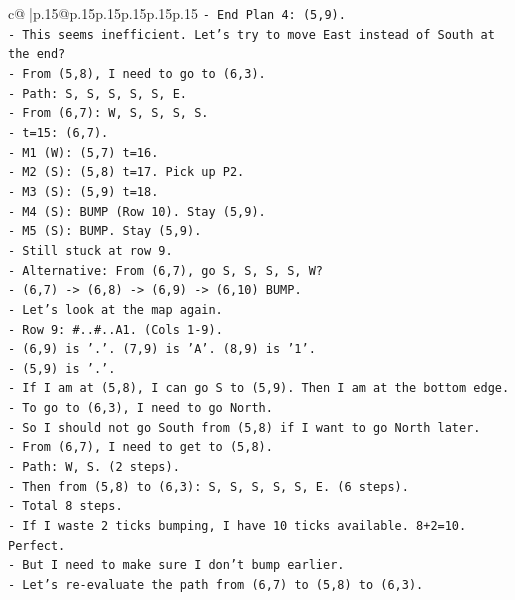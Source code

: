 \documentclass{article}
\begin{document}
{\begin{supertabular}{c@{$\;$}|p{.15\linewidth}@{}p{.15\linewidth}p{.15\linewidth}p{.15\linewidth}p{.15\linewidth}p{.15\linewidth}}
{{{\texttt{{-} End Plan 4: (5,9).} \\
\texttt{{-} This seems inefficient. Let's try to move East instead of South at the end?} \\
\texttt{{-} From (5,8), I need to go to (6,3).} \\
\texttt{{-} Path: S, S, S, S, S, E.} \\
\texttt{{-} From (6,7): W, S, S, S, S.} \\
\texttt{{-} t=15: (6,7).} \\
\texttt{{-} M1 (W): (5,7) t=16.} \\
\texttt{{-} M2 (S): (5,8) t=17. Pick up P2.} \\
\texttt{{-} M3 (S): (5,9) t=18.} \\
\texttt{{-} M4 (S): BUMP (Row 10). Stay (5,9).} \\
\texttt{{-} M5 (S): BUMP. Stay (5,9).} \\
\texttt{{-} Still stuck at row 9.} \\
\texttt{{-} Alternative: From (6,7), go S, S, S, S, W?} \\
\texttt{{-} (6,7) {-}> (6,8) {-}> (6,9) {-}> (6,10) BUMP.} \\
\texttt{{-} Let's look at the map again.} \\
\texttt{{-} Row 9: \#..\#..A1. (Cols 1{-}9).} \\
\texttt{{-} (6,9) is '.'. (7,9) is 'A'. (8,9) is '1'.} \\
\texttt{{-} (5,9) is '.'.} \\
\texttt{{-} If I am at (5,8), I can go S to (5,9). Then I am at the bottom edge.} \\
\texttt{{-} To go to (6,3), I need to go North.} \\
\texttt{{-} So I should not go South from (5,8) if I want to go North later.} \\
\texttt{{-} From (6,7), I need to get to (5,8).} \\
\texttt{{-} Path: W, S. (2 steps).} \\
\texttt{{-} Then from (5,8) to (6,3): S, S, S, S, S, E. (6 steps).} \\
\texttt{{-} Total 8 steps.} \\
\texttt{{-} If I waste 2 ticks bumping, I have 10 ticks available. 8+2=10. Perfect.} \\
\texttt{{-} But I need to make sure I don't bump earlier.} \\
\texttt{{-} Let's re{-}evaluate the path from (6,7) to (5,8) to (6,3).} \\
}}}
\end{supertabular}}
\end{document}
